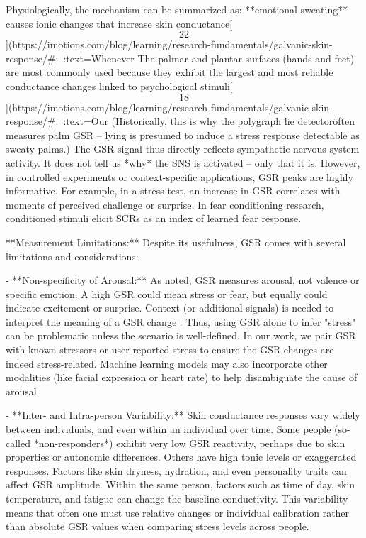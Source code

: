 \documentclass[12pt,a4paper]{article}
\begin{document}
Physiologically, the mechanism can be summarized as: **emotional
sweating** causes ionic changes that increase skin
conductance[\[22\]](https://imotions.com/blog/learning/research-fundamentals/galvanic-skin-response/#:~:text=Whenever%
The palmar and plantar surfaces (hands and feet) are most commonly used
because they exhibit the largest and most reliable conductance changes
linked to psychological
stimuli[\[18\]](https://imotions.com/blog/learning/research-fundamentals/galvanic-skin-response/#:~:text=Our%
(Historically, this is why the polygraph \"lie detector\" often measures
palm GSR -- lying is presumed to induce a stress response detectable as
sweaty palms.) The GSR signal thus directly reflects sympathetic nervous
system activity. It does not tell us *why* the SNS is activated -- only
that it is. However, in controlled experiments or context-specific
applications, GSR peaks are highly informative. For example, in a stress
test, an increase in GSR correlates with moments of perceived challenge
or surprise. In fear conditioning research, conditioned stimuli elicit
SCRs as an index of learned fear response.

**Measurement Limitations:** Despite its usefulness, GSR comes with
several limitations and considerations:

- **Non-specificity of Arousal:** As noted, GSR measures arousal, not
  valence or specific emotion. A high GSR could mean stress or fear, but
  equally could indicate excitement or surprise. Context (or additional
  signals) is needed to interpret the meaning of a GSR
  change \citep{Boucsein2012}.
  Thus, using GSR alone to infer "stress" can be problematic unless the
  scenario is well-defined. In our work, we pair GSR with known
  stressors or user-reported stress to ensure the GSR changes are indeed
  stress-related. Machine learning models may also incorporate other
  modalities (like facial expression or heart rate) to help disambiguate
  the cause of arousal.

- **Inter- and Intra-person Variability:** Skin conductance responses
  vary widely between individuals, and even within an individual over
  time. Some people (so-called *non-responders*) exhibit very low GSR
  reactivity, perhaps due to skin properties or autonomic differences.
  Others have high tonic levels or exaggerated responses. Factors like
  skin dryness, hydration, and even personality traits can affect GSR
  amplitude. Within the same person, factors such as time of day, skin
  temperature, and fatigue can change the baseline conductivity. This
  variability means that often one must use relative changes or
  individual calibration rather than absolute GSR values when comparing
  stress levels across people.
\end{document}
